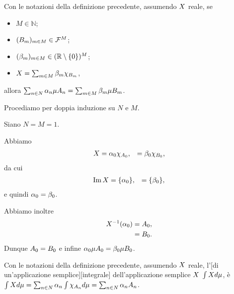 \begin{Theorem}
  Con le notazioni della definizione precedente,
  assumendo $X$ reale,
  se
  \begin{itemize}
    \item $M \in \mathbb{N}$;
    \item $(B_m)_{m \in M} \in \mathcal{F}^M$;
    \item $(\beta_m)_{m \in M} \in (\mathbb{R} \setminus \lbrace 0 \rbrace)^M$;
    \item $X
      = \sum_{m \in M}
        \beta_m\chi_{B_m}$,
  \end{itemize}
  allora
  $\sum_{n \in N} \alpha_n \mu{A_n}
    = \sum_{m \in M} \beta_m \mu{B_m}$.
\end{Theorem}
\Proof Procediamo per doppia induzione su $N$ e $M$.
\par Siano $N = M = 1$.
\par Abbiamo 
\begin{align*}
  X
  &= \alpha_0 \chi_{A_0},
  &= \beta_0 \chi_{B_0},
\end{align*}
da cui
\begin{align*}
  \operatorname{Im}{X}
  &= \lbrace \alpha_0 \rbrace,
  &= \lbrace \beta_0 \rbrace,
\end{align*}
e quindi $\alpha_0 = \beta_0$.
\par Abbiamo inoltre
\begin{align*}
  X^{-1}(\alpha_0)
  &= A_0,\\
  &= B_0.
\end{align*}
Dunque
$A_0 = B_0$
e infine
$\alpha_0 \mu{A_0}
= \beta_0 \mu{B_0}$.
\begin{Definition}
  Con le notazioni della definizione precedente,
  assumendo $X$ reale,
  l'[di un'applicazione semplice][integrale]
  dell'applicazione semplice 
  $X$
  $\int X d\mu$, \`e 
  $\int X d\mu
    = \sum_{n \in N} \alpha_n
      \int \chi_{A_n}d\mu
    = \sum_{n \in N} \alpha_n A_n$.
\end{Definition}
